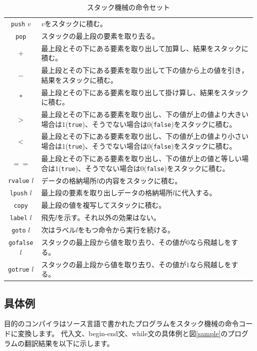 \documentclass[a4paper,11pt]{jsarticle}
\begin{document}
\begin{table}[H]
\caption{スタック機械の命令セット} \label{stackcommand}
\centering
\normalsize{
  \begin{tabular}{c|p{}}
    \hline
    \texttt{push} $v$ & $v$をスタックに積む。\\
    \texttt{pop} & スタックの最上段の要素を取り去る。\\
    $+$ & 最上段とその下にある要素を取り出して加算し、結果をスタックに積む。\\
    $-$ & 最上段とその下にある要素を取り出して下の値から上の値を引き，結果をスタックに積む。\\
    $\ast$ & 最上段とその下にある要素を取り出して掛け算し、結果をスタックに積む。\\
    $>$ & 最上段とその下にある要素を取り出し、下の値が上の値より大きい場合は$1$(\texttt{true})、そうでない場合は$0$(\texttt{false})をスタックに積む。\\
    $<$ & 最上段とその下にある要素を取り出し、下の値が上の値より小さい場合は$1$(\texttt{true})、そうでない場合は$0$(\texttt{false})をスタックに積む。\\
    $==$ & 最上段とその下にある要素を取り出し、下の値が上の値と等しい場合は$1$(\texttt{true})、そうでない場合は$0$(\texttt{false})をスタックに積む。\\
    \texttt{rvalue} $l$ & データの格納場所$l$の内容をスタックに積む。\\
    \texttt{lpush} $l$ & 最上段の要素を取り出しデータの格納場所$l$に代入する。\\
    \texttt{copy} & 最上段の値を複写してスタックに積む。\\
    \texttt{label} $l$ & 飛先$l$を示す。それ以外の効果はない。\\
    \texttt{goto} $l$ & 次はラベル$l$をもつ命令から実行を続ける。\\
    \texttt{gofalse} $l$ & スタックの最上段から値を取り去り、その値が$0$なら飛越しをする。\\
    \texttt{gotrue} $l$ & スタックの最上段から値を取り去り、その値が$1$なら飛越しをする。\\
    \hline
  \end{tabular}
}
\end{table}

\subsection{具体例}
目的のコンパイラはソース言語で書かれたプログラムをスタック機械の命令コードに変換します。
代入文、begin-end文、while文の具体例と図\ref{sample}のプログラムの翻訳結果を以下に示します。
\end{document}
